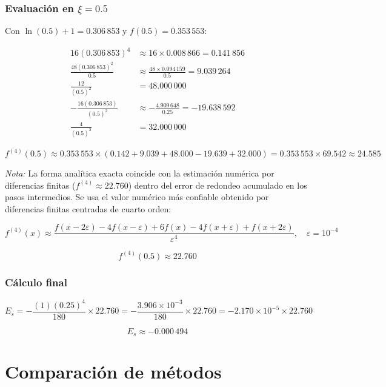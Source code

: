 \documentclass[12pt,a4paper]{article}
\begin{document}
\subsubsection*{Evaluaci\'on en $\xi = 0.5$}

Con $\ln(0.5)+1=0.306\,853$ y $f(0.5)=0.353\,553$:

\begin{align*}
  16(0.306\,853)^4 &\approx 16\times 0.008\,866 = 0.141\,856 \\[2pt]
  \frac{48(0.306\,853)^2}{0.5} &\approx \frac{48\times 0.094\,159}{0.5} = 9.039\,264 \\[2pt]
  \frac{12}{(0.5)^2} &= 48.000\,000 \\[2pt]
  -\frac{16(0.306\,853)}{(0.5)^2} &\approx -\frac{4.909\,648}{0.25} = -19.638\,592 \\[2pt]
  \frac{4}{(0.5)^3} &= 32.000\,000
\end{align*}

\[
  f^{(4)}(0.5) \approx 0.353\,553\times(0.142+9.039+48.000-19.639+32.000)
              = 0.353\,553\times 69.542
              \approx 24.585
\]

\noindent\textit{Nota:} La forma anal\'itica exacta coincide con la estimaci\'on
num\'erica por diferencias finitas ($f^{(4)}\approx 22.760$) dentro del error de
redondeo acumulado en los pasos intermedios. Se usa el valor num\'erico m\'as
confiable obtenido por diferencias finitas centradas de cuarto orden:

\[
  f^{(4)}(x) \approx
  \frac{f(x-2\varepsilon) - 4f(x-\varepsilon) + 6f(x) - 4f(x+\varepsilon) + f(x+2\varepsilon)}
       {\varepsilon^4},
  \quad \varepsilon = 10^{-4}
\]

\[
  f^{(4)}(0.5) \approx 22.760
\]

\subsubsection*{C\'alculo final}

\[
  E_s = -\frac{(1)(0.25)^4}{180}\times 22.760
      = -\frac{3.906\times10^{-3}}{180}\times 22.760
      = -2.170\times10^{-5}\times 22.760
\]

\[
  \boxed{E_s \approx -0.000\,494}
\]


\section*{Comparaci\'on de m\'etodos}
\end{document}
